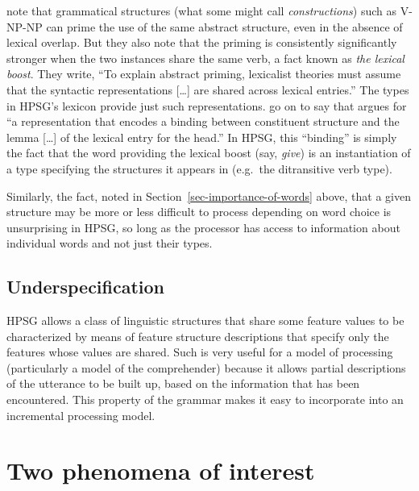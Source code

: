 \documentclass[output=paper
	        ,collection
	        ,collectionchapter
 	        ,biblatex
                ,babelshorthands
                ,newtxmath
                ,draftmode
                ,colorlinks, citecolor=brown
]{langscibook}
\begin{document}
\citet{BraniganPickering2017} note that grammatical structures (what some might call
\emph{constructions}) such as V-NP-NP can prime the use of the same abstract
structure, even in the absence of lexical overlap.  But they also note that the priming is
consistently significantly stronger when the two instances share the same verb, a fact known as
\emph{the lexical boost}.  They write, ``To explain abstract priming, lexicalist
theories must assume that the syntactic representations [\ldots]  are shared across lexical entries.''
The types in HPSG's lexicon provide just such representations. \citeauthor{BraniganPickering2017} go
on to say that  argues for ``a representation that encodes a binding between
constituent structure and the lemma [\ldots] of the lexical entry for the head.''  In HPSG, this
``binding'' is simply the fact that the word providing the lexical boost (say, \emph{give}) is an
instantiation of a type specifying the structures it appears in (e.g.\ the ditransitive verb
type).

Similarly, the fact, noted in Section~\ref{sec-importance-of-words} above, that a given structure
may be more or less difficult to process depending on word choice is unsurprising in HPSG, so long
as the processor has access to information about individual words and not just their types.    

\subsection{Underspecification}

HPSG allows a class of linguistic structures that share some feature values to be characterized by
means of feature structure descriptions that specify only the features whose values are shared.
Such  is very useful for a model of processing (particularly a model of the
comprehender) because it allows partial descriptions of the utterance to be built up, based on the
information that has been encountered.  This property of the grammar makes it easy to incorporate
into an incremental processing model.

\section{Two phenomena of interest}
\label{sec-phenomena-processing}
\end{document}
